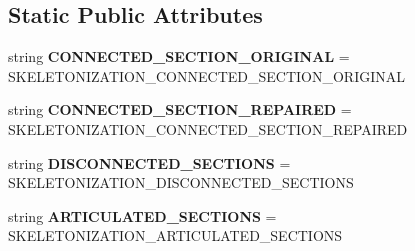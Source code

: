 \subsection*{Static Public Attributes}
\begin{DoxyCompactItemize}
\item 
string {\bfseries C\+O\+N\+N\+E\+C\+T\+E\+D\+\_\+\+S\+E\+C\+T\+I\+O\+N\+\_\+\+O\+R\+I\+G\+I\+N\+AL} = \textquotesingle{}S\+K\+E\+L\+E\+T\+O\+N\+I\+Z\+A\+T\+I\+O\+N\+\_\+\+C\+O\+N\+N\+E\+C\+T\+E\+D\+\_\+\+S\+E\+C\+T\+I\+O\+N\+\_\+\+O\+R\+I\+G\+I\+N\+AL\textquotesingle{}\hypertarget{classmeshy_1_1neuromorphovis_1_1enums_1_1skeletonization__enums_1_1Skeletonization_1_1Method_ad17399161f5adb7675c1527caec8e9c2}{}\label{classmeshy_1_1neuromorphovis_1_1enums_1_1skeletonization__enums_1_1Skeletonization_1_1Method_ad17399161f5adb7675c1527caec8e9c2}

\item 
string {\bfseries C\+O\+N\+N\+E\+C\+T\+E\+D\+\_\+\+S\+E\+C\+T\+I\+O\+N\+\_\+\+R\+E\+P\+A\+I\+R\+ED} = \textquotesingle{}S\+K\+E\+L\+E\+T\+O\+N\+I\+Z\+A\+T\+I\+O\+N\+\_\+\+C\+O\+N\+N\+E\+C\+T\+E\+D\+\_\+\+S\+E\+C\+T\+I\+O\+N\+\_\+\+R\+E\+P\+A\+I\+R\+ED\textquotesingle{}\hypertarget{classmeshy_1_1neuromorphovis_1_1enums_1_1skeletonization__enums_1_1Skeletonization_1_1Method_a2a967e67f4c0207ff29a8815de9eaa35}{}\label{classmeshy_1_1neuromorphovis_1_1enums_1_1skeletonization__enums_1_1Skeletonization_1_1Method_a2a967e67f4c0207ff29a8815de9eaa35}

\item 
string {\bfseries D\+I\+S\+C\+O\+N\+N\+E\+C\+T\+E\+D\+\_\+\+S\+E\+C\+T\+I\+O\+NS} = \textquotesingle{}S\+K\+E\+L\+E\+T\+O\+N\+I\+Z\+A\+T\+I\+O\+N\+\_\+\+D\+I\+S\+C\+O\+N\+N\+E\+C\+T\+E\+D\+\_\+\+S\+E\+C\+T\+I\+O\+NS\textquotesingle{}\hypertarget{classmeshy_1_1neuromorphovis_1_1enums_1_1skeletonization__enums_1_1Skeletonization_1_1Method_abed9393522c57f237c8c83662c826fc5}{}\label{classmeshy_1_1neuromorphovis_1_1enums_1_1skeletonization__enums_1_1Skeletonization_1_1Method_abed9393522c57f237c8c83662c826fc5}

\item 
string {\bfseries A\+R\+T\+I\+C\+U\+L\+A\+T\+E\+D\+\_\+\+S\+E\+C\+T\+I\+O\+NS} = \textquotesingle{}S\+K\+E\+L\+E\+T\+O\+N\+I\+Z\+A\+T\+I\+O\+N\+\_\+\+A\+R\+T\+I\+C\+U\+L\+A\+T\+E\+D\+\_\+\+S\+E\+C\+T\+I\+O\+NS\textquotesingle{}\hypertarget{classmeshy_1_1neuromorphovis_1_1enums_1_1skeletonization__enums_1_1Skeletonization_1_1Method_a96501ae23b5e9589842b418a8215ce15}{}\label{classmeshy_1_1neuromorphovis_1_1enums_1_1skeletonization__enums_1_1Skeletonization_1_1Method_a96501ae23b5e9589842b418a8215ce15}


\end{DoxyCompactItemize}
